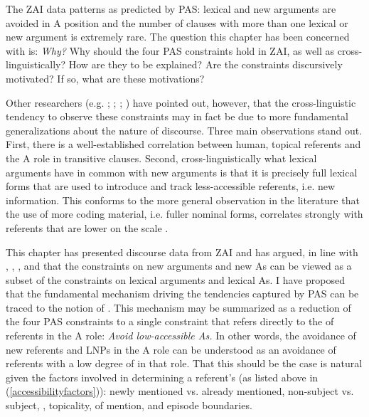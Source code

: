 The ZAI data patterns as predicted by PAS: lexical and new arguments are avoided in A position and the number of clauses with more than one lexical or new argument is extremely rare. The question this chapter has been concerned with is: \textit{Why?} Why should the four PAS constraints hold in ZAI, as well as cross-linguistically? How are they to be explained? Are the constraints discursively motivated? If so, what are these motivations? 


Other researchers (e.g. \citealt{haspelmath2006}; \citealt{everett2009}; \citealt{haig2016}; \citealt{schnell2017}) have pointed out, however, that the cross-linguistic tendency to observe these constraints may in fact be due to more fundamental generalizations about the nature of discourse. Three main observations stand out. First, there is a well-established correlation between human, topical referents and the A role in transitive clauses. Second, cross-linguistically what lexical arguments have in common with new arguments is that it is precisely full lexical forms that are used to introduce and track less-accessible \citep{ariel1990} referents, i.e. new information. This conforms to the more general observation in the literature that the use of more coding material, i.e. fuller nominal forms, correlates strongly with referents that are lower on the  scale \citep{givon1983}. 

This chapter has presented discourse data from ZAI and has argued, in line with \citet{haspelmath2006}, \citet{everett2009}, \citet{haig2016}, and \citet{schnell2017} that the constraints on new arguments and new As can be viewed as a subset of the constraints on lexical arguments and lexical As. I have proposed that the fundamental mechanism driving the tendencies captured by PAS can be traced to the notion of  \citep{ariel1990,ariel2001}. This mechanism may be summarized as a reduction of the four PAS constraints to a single constraint that refers directly to the  of referents in the A role: \textit{Avoid low-accessible As.} In other words, the avoidance of new referents and LNPs in the A role can be understood as an avoidance of referents with a low degree of  in that role. That this should be the case is natural given the factors involved in determining a referent's  (as listed above in (\ref{accessibilityfactors})): newly mentioned vs. already mentioned, non-subject vs. subject, , topicality,  of mention, and episode boundaries. 


